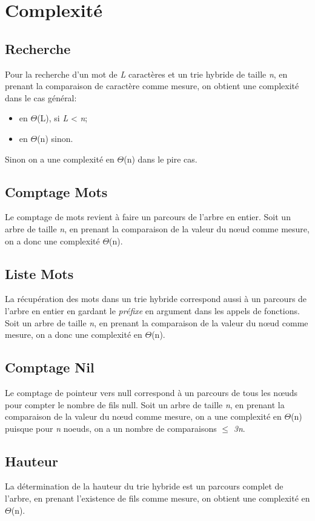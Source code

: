\documentclass[a4paper,12pt]{report}
\begin{document}
\section{Complexité}
\subsection{Recherche}
Pour la recherche d'un mot de \textit{L} caractères et un trie hybride de taille \textit{n}, 
en prenant la comparaison de caractère comme mesure, on obtient une complexité dans le cas général:
\begin{itemize}
 \item en $\Theta$(L), si \textit{L} < \textit{n};
 \item en $\Theta$(n) sinon.
\end{itemize}
Sinon on a une complexité en $\Theta$(n) dans le pire cas.

\subsection{Comptage Mots}
Le comptage de mots revient à faire un parcours de l'arbre en entier.
Soit un arbre de taille \textit{n}, en prenant la comparaison de la valeur du nœud comme mesure,
on a donc une complexité $\Theta$(n).

\subsection{Liste Mots}
La récupération des mots dans un trie hybride correspond aussi à un parcours de l'arbre en entier en gardant le \textit{préfixe}
en argument dans les appels de fonctions.
Soit un arbre de taille \textit{n}, en prenant la comparaison de la valeur du nœud comme mesure,
on a donc une complexité en $\Theta$(n).

\subsection{Comptage Nil}
Le comptage de pointeur vers null correspond à un parcours de tous les nœuds pour compter le nombre de fils null.
Soit un arbre de taille \textit{n}, en prenant la comparaison de la valeur du nœud comme mesure,
on a une complexité en $\Theta$(n) puisque pour \textit{n} noeuds, on a un nombre de comparaisons $\le$ \textit{3n}.

\subsection{Hauteur}
La détermination de la hauteur du trie hybride est un parcours complet de l'arbre, en prenant l'existence de fils comme mesure, on obtient une complexité en $\Theta$(n).
\end{document}
